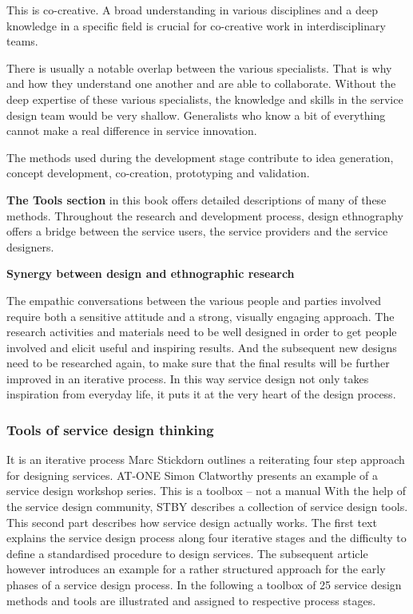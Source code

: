 This is co-creative.
A broad understanding in various disciplines and a deep knowledge in a specific field is crucial for co-creative work in interdisciplinary teams.

There is usually a notable overlap between the various specialists. That is why and how they understand one another and are able to collaborate. Without the deep expertise of these various specialists, the knowledge and skills in the service design team would be very shallow. Generalists who know a bit of everything cannot make a real difference in service innovation.

The methods used during the development stage contribute to idea generation, concept development, co-creation, prototyping and validation.

\textbf{The Tools section} in this book offers detailed descriptions of many of these methods. Throughout the research and development process, design ethnography offers a bridge between the service users, the service providers and the service designers.

\textbf{Synergy between design and ethnographic research}

The empathic conversations between the various people and parties involved require both a sensitive attitude and a strong, visually engaging approach. The research activities and materials need to be well designed in order to get people involved and elicit useful and inspiring results. And the subsequent new designs need to be researched again, to make sure that the final results will be further improved in an iterative process. In this way service design not only takes inspiration from everyday life, it puts it at the very heart of the design process.

\subsubsection{Tools of service design thinking}

It is an iterative process
Marc Stickdorn outlines a reiterating four step approach for designing services.
AT-ONE
Simon Clatworthy presents an example of a service design workshop series.
This is a toolbox – not a manual
With the help of the service design community, STBY describes a collection of service design tools.
This second part describes how service design actually works.
The first text explains the service design process along four iterative stages and the difficulty to define a standardised procedure to design services. The subsequent article however introduces an example for a rather structured approach for the early phases of a service design process. In the following a toolbox of 25 service design methods and tools are illustrated and assigned to respective process stages.

